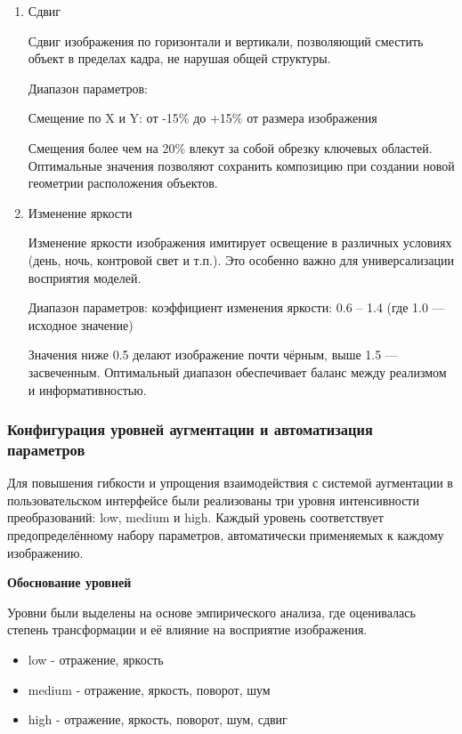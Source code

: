 \begin{enumerate}

	\item Сдвиг

Сдвиг изображения по горизонтали и вертикали, позволяющий сместить объект в пределах кадра, не нарушая общей структуры.

Диапазон параметров:

Смещение по X и Y: от -15\% до +15\% от размера изображения

Смещения более чем на 20\% влекут за собой обрезку ключевых областей. Оптимальные значения позволяют сохранить композицию при создании новой геометрии расположения объектов.



	\item Изменение яркости

Изменение яркости изображения имитирует освещение в различных условиях (день, ночь, контровой свет и т.п.). Это особенно важно для универсализации восприятия моделей.

Диапазон параметров: коэффициент изменения яркости: 0.6 – 1.4
(где 1.0 — исходное значение)

Значения ниже 0.5 делают изображение почти чёрным, выше 1.5 — засвеченным. Оптимальный диапазон обеспечивает баланс между реализмом и информативностью.


\end{enumerate}


\subsubsection{Конфигурация уровней аугментации и автоматизация параметров}

Для повышения гибкости и упрощения взаимодействия с системой аугментации в пользовательском интерфейсе были реализованы три уровня интенсивности преобразований: low, medium и high. Каждый уровень соответствует предопределённому набору параметров, автоматически применяемых к каждому изображению.

\textbf{Обоснование уровней}

Уровни были выделены на основе эмпирического анализа, где оценивалась степень трансформации и её влияние на восприятие изображения. %
\begin{itemize}
	\item low - отражение, яркость
	\item medium - отражение, яркость, поворот, шум
	\item high - отражение, яркость, поворот, шум, сдвиг
\end{itemize}
	
